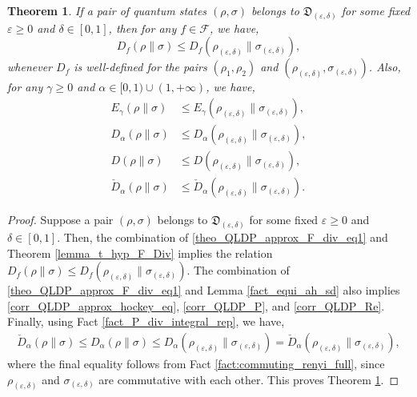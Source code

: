 \documentclass[onecolumn,ldraftcls, 11pt]{IEEEtran}
\newtheorem{theorem}{\bf{Theorem}}
\newcommand{\eps}{\varepsilon}
\newcommand*{\cF}{\mathcal{F}}
\begin{document}
\begin{theorem}\label{theo_QLDP_approx_F_div_bound}
    If a pair of quantum states $(\rho,\sigma)$ belongs to $\mathfrak{D}_{(\eps,\delta)}$ for some fixed $\eps \geq 0$ and $\delta \in [0,1]$, 
    then for any $f \in \cF$, we have,
    \begin{equation}
        D_f(\rho\|\sigma) \leq D_f(\rho_{(\eps,\delta)}\|\sigma_{(\eps,\delta)}),\label{theo_QLDP_approx_F_div_eq}
    \end{equation}
    whenever $D_f$ is well-defined for the pairs $(\rho_1,\rho_2)$ and $(\rho_{(\eps,\delta)},\sigma_{(\eps,\delta)})$.
Also, for any $\gamma \geq 0$
    and $\alpha \in [0,1) \cup (1,+\infty)$, we have,
    \begin{align}
        E_{\gamma}(\rho\|\sigma)& \leq E_{\gamma}(\rho_{(\eps,\delta)}\|\sigma_{(\eps,\delta)}),\label{corr_QLDP_approx_hockey_eq} \\
        D_{\alpha}(\rho\|\sigma)& \leq D_{\alpha}(\rho_{(\eps,\delta)}\|\sigma_{(\eps,\delta)}),\label{corr_QLDP_P} \\
        D(\rho\|\sigma)& \leq D(\rho_{(\eps,\delta)}\|\sigma_{(\eps,\delta)}),\label{corr_QLDP_Re} \\
        \check{D}_{\alpha}(\rho\|\sigma)& \leq \check{D}_{\alpha}(\rho_{(\eps,\delta)}\|\sigma_{(\eps,\delta)}).\label{corr_QLDP_S}
    \end{align}
\end{theorem}
\begin{proof}
Suppose a pair $(\rho,\sigma)$ belongs to 
$\mathfrak{D}_{(\varepsilon,\delta)}$ for some fixed $\varepsilon \geq 0$ and $\delta \in [0,1]$. 
   Then, the combination of \eqref{theo_QLDP_approx_F_div_eq1} and
Theorem \ref{lemma_t_hyp_F_Div} implies the relation $D_f(\rho\|\sigma) \leq D_f(\rho_{(\eps,\delta)}\|\sigma_{(\eps,\delta)})$. 
The combination of \eqref{theo_QLDP_approx_F_div_eq1} and
Lemma \ref{fact_equi_ah_sd}
also implies 
\eqref{corr_QLDP_approx_hockey_eq}, \eqref{corr_QLDP_P}, and \eqref{corr_QLDP_Re}.
    Finally, using Fact \ref{fact_P_div_integral_rep}, we have, 
    \begin{align}
            \check{D}_{\alpha}(\rho\|\sigma)\leq 
                    D_{\alpha}(\rho\|\sigma) \leq D_{\alpha}(\rho_{(\eps,\delta)}\|\sigma_{(\eps,\delta)})=
            \check{D}_{\alpha}(\rho_{(\eps,\delta)}\|\sigma_{(\eps,\delta)}),    \end{align}
    where the final equality follows from Fact \ref{fact:commuting_renyi_full}, since 
    $\rho_{(\eps,\delta)}$ and $\sigma_{(\eps,\delta)}$
   are commutative with each other. 
    This proves Theorem \ref{theo_QLDP_approx_F_div_bound}.
\end{proof}
\end{document}

